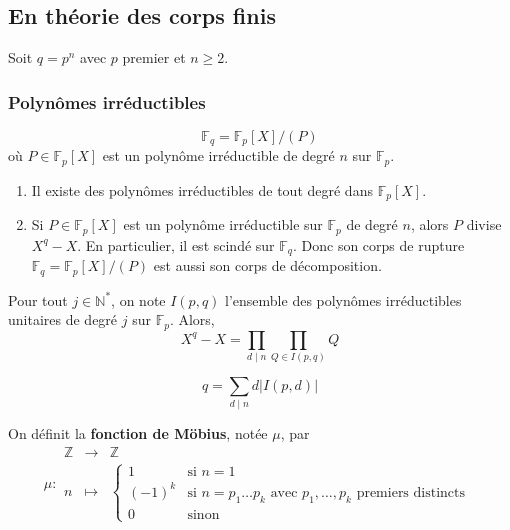   \subsection{En théorie des corps finis}

  Soit $q = p^n$ avec $p$ premier et $n \geq 2$.

  \subsubsection{Polynômes irréductibles}


  \begin{theorem}
    \[ \mathbb{F}_q = \mathbb{F}_p[X] / (P) \]
    où $P \in \mathbb{F}_p[X]$ est un polynôme irréductible de degré $n$ sur $\mathbb{F}_p$.
  \end{theorem}

  \begin{corollary}
    \begin{enumerate}[label=(\roman*)]
      \item Il existe des polynômes irréductibles de tout degré dans $\mathbb{F}_p[X]$.
      \item Si $P \in \mathbb{F}_p[X]$ est un polynôme irréductible sur $\mathbb{F}_p$ de degré $n$, alors $P$ divise $X^q - X$. En particulier, il est scindé sur $\mathbb{F}_q$. Donc son corps de rupture $\mathbb{F}_q = \mathbb{F}_p[X] / (P)$ est aussi son corps de décomposition.
    \end{enumerate}
  \end{corollary}

  \begin{theorem}
    Pour tout $j \in \mathbb{N}^*$, on note $I(p,q)$ l'ensemble des polynômes irréductibles unitaires de degré $j$ sur $\mathbb{F}_p$. Alors,
    \[ X^q - X = \prod_{d \mid n} \prod_{Q \in I(p,q)} Q \]
  \end{theorem}

  \begin{corollary}
    \[ q = \sum_{d \mid n} d \vert I(p,d) \vert \]
  \end{corollary}

  \begin{definition}
    On définit la \textbf{fonction de Möbius}, notée $\mu$, par
    \[
    \mu :
    \begin{array}{ccc}
      \mathbb{Z} &\rightarrow& \mathbb{Z} \\
      n &\mapsto& \begin{cases}
        1 &\text{si } n = 1 \\
        (-1)^k &\text{si } n = p_1 \dots p_k \text{ avec } p_1, \dots, p_k \text{ premiers distincts} \\
        0 &\text{sinon}
      \end{cases}
    \end{array}
    \]
  \end{definition}

